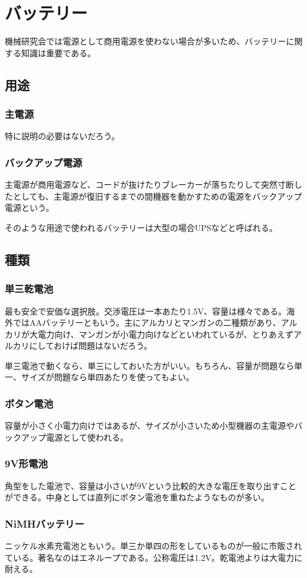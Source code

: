 \documentclass[a4paper,titlepage,here]{ujarticle}
\begin{document}
\section{バッテリー}
機械研究会では電源として商用電源を使わない場合が多いため、バッテリーに関する知識は重要である。
\subsection{用途}
\subsubsection{主電源}
特に説明の必要はないだろう。
\subsubsection{バックアップ電源}
主電源が商用電源など、コードが抜けたりブレーカーが落ちたりして突然寸断したとしても、主電源が復旧するまでの間機器を動かすための電源をバックアップ電源という。

そのような用途で使われるバッテリーは大型の場合UPSなどと呼ばれる。
\subsection{種類}
\subsubsection{単三乾電池}
最も安全で安価な選択肢。交渉電圧は一本あたり1.5V、容量は様々である。海外ではAAバッテリーともいう。主にアルカリとマンガンの二種類があり、アルカリが大電力向け、マンガンが小電力向けなどといわれているが、とりあえずアルカリにしておけば問題はないだろう。

単三電池で動くなら、単三にしておいた方がいい。もちろん、容量が問題なら単一、サイズが問題なら単四あたりを使ってもよい。
\subsubsection{ボタン電池}
容量が小さく小電力向けではあるが、サイズが小さいため小型機器の主電源やバックアップ電源として使われる。
\subsubsection{9V形電池}
角型をした電池で、容量は小さいが9Vという比較的大きな電圧を取り出すことができる。中身としては直列にボタン電池を重ねたようなものが多い。
\subsubsection{NiMHバッテリー}
ニッケル水素充電池ともいう。単三か単四の形をしているものが一般に市販されている。著名なのはエネループである。公称電圧は1.2V。乾電池よりは大電力に耐える。
\end{document}
